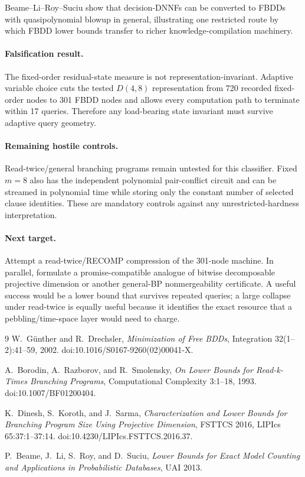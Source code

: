 Beame--Li--Roy--Suciu show that decision-DNNFs can be converted to FBDDs with quasipolynomial blowup in general, illustrating one restricted route by which FBDD lower bounds transfer to richer knowledge-compilation machinery.

\paragraph{Falsification result.}
The fixed-order residual-state measure is not representation-invariant. Adaptive variable choice cuts the tested \(D(4,8)\) representation from 720 recorded fixed-order nodes to 301 FBDD nodes and allows every computation path to terminate within 17 queries. Therefore any load-bearing state invariant must survive adaptive query geometry.

\paragraph{Remaining hostile controls.}
Read-twice/general branching programs remain untested for this classifier. Fixed \(m=8\) also has the independent polynomial pair-conflict circuit and can be streamed in polynomial time while storing only the constant number of selected clause identities. These are mandatory controls against any unrestricted-hardness interpretation.

\paragraph{Next target.}
Attempt a read-twice/RECOMP compression of the 301-node machine. In parallel, formulate a promise-compatible analogue of bitwise decomposable projective dimension or another general-BP nonmergeability certificate. A useful success would be a lower bound that survives repeated queries; a large collapse under read-twice is equally useful because it identifies the exact resource that a pebbling/time-space layer would need to charge.

\begin{thebibliography}{9}
W.~G\"unther and R.~Drechsler,
\emph{Minimization of Free BDDs},
Integration 32(1--2):41--59, 2002.
doi:10.1016/S0167-9260(02)00041-X.

A.~Borodin, A.~Razborov, and R.~Smolensky,
\emph{On Lower Bounds for Read-k-Times Branching Programs},
Computational Complexity 3:1--18, 1993.
doi:10.1007/BF01200404.

K.~Dinesh, S.~Koroth, and J.~Sarma,
\emph{Characterization and Lower Bounds for Branching Program Size Using Projective Dimension},
FSTTCS 2016, LIPIcs 65:37:1--37:14.
doi:10.4230/LIPIcs.FSTTCS.2016.37.

P.~Beame, J.~Li, S.~Roy, and D.~Suciu,
\emph{Lower Bounds for Exact Model Counting and Applications in Probabilistic Databases},
UAI 2013.
\end{thebibliography}

